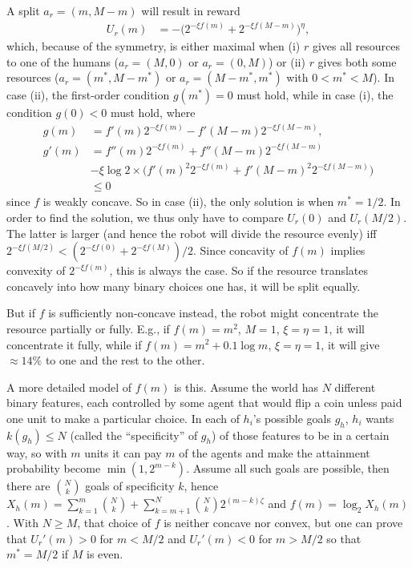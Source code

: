 \documentclass[letterpaper]{article} %
\begin{document}
A split $a_r=(m,M-m)$ will result in reward 
\begin{align*}
    U_r(m) &= -\big(2^{-\xi f(m)} + 2^{-\xi f(M-m)}\big)^\eta,
\end{align*}
which, because of the symmetry, is either maximal when 
(i) $r$ gives all resources to one of the humans ($a_r=(M,0)$ or $a_r=(0,M)$)
or (ii) $r$ gives both some resources ($a_r=(m^\ast,M-m^\ast)$ or $a_r=(M-m^\ast,m^\ast)$ with $0<m^\ast<M$).
In case (ii), the first-order condition $g(m^\ast)=0$ must hold,
while in case (i), the condition $g(0)<0$ must hold,
where 
\begin{align*}
    g(m) &= f'(m) 2^{-\xi f(m)} - f'(M-m) 2^{-\xi f(M-m)}, \\
    g'(m) &= f''(m) 2^{-\xi f(m)} + f''(M-m) 2^{-\xi f(M-m)} \\
        &- \xi\log 2\times\big(f'(m)^2 2^{-\xi f(m)} + f'(M-m)^2 2^{-\xi f(M-m)}\big) \\
        &\le 0
\end{align*}
since $f$ is weakly concave.
So in case (ii), the only solution is when $m^\ast=1/2$. In order to find the solution, we thus only have to compare $U_r(0)$ and $U_r(M/2)$.
The latter is larger (and hence the robot will divide the resource evenly) iff $2^{-\xi f(M/2)} < (2^{-\xi f(0)} + 2^{-\xi f(M)}) / 2$.
Since concavity of $f(m)$ implies convexity of $2^{-\xi f(m)}$, this is always the case. 
So if the resource translates concavely into how many binary choices one has, it will be split equally.

But if $f$ is sufficiently non-concave instead, the robot might concentrate the resource partially or fully. 
E.g., if $f(m)=m^2$, $M=1$, $\xi=\eta=1$, it will concentrate it fully, 
while if $f(m)=m^2+0.1\log m$, $\xi=\eta=1$, it will give $\approx 14\%$ to one and the rest to the other.

A more detailed model of $f(m)$ is this. Assume the world has $N$ different binary features, each controlled by some agent that would flip a coin unless paid one unit to make a particular choice. 
In each of $h_i$'s possible goals $g_h$, $h_i$ wants $k(g_h)\le N$ (called the ``specificity'' of $g_h$) of those features to be in a certain way, so with $m$ units it can pay $m$ of the agents and make the attainment probability become $\min(1,2^{m-k})$.
Assume all such goals are possible, then there are $N\choose k$ goals of specificity $k$, hence
$X_h(m) = \sum_{k=1}^m {N\choose k} + \sum_{k=m+1}^N {N\choose k}2^{(m-k)\zeta}$
and $f(m)=\log_2 X_h(m)$. 
With $N\ge M$, that choice of $f$ is neither concave nor convex, but one can prove that $U_r'(m)>0$ for $m<M/2$ and $U_r'(m)<0$ for $m>M/2$ so that $m^\ast=M/2$ if $M$ is even.
\end{document}
